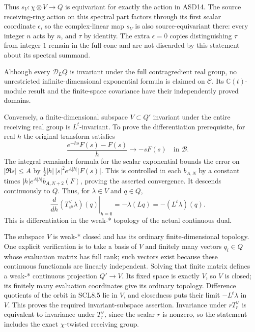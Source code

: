 Thus \(s_V:\chi\otimes V\to Q\) is equivariant for exactly the action in
ASD14. The source receiving-ring action on this spectral part factors
through its first scalar coordinate \(\epsilon\), so the complex-linear
map \(s_V\) is also source-equivariant there: every integer \(n\) acts
by \(n\), and \(\tau\) by identity. The extra \(\epsilon=0\) copies
distinguishing \(\tau\) from integer \(1\) remain in the full cone and
are not discarded by this statement about its spectral summand.

Although every \(\mathcal D_LQ\) is invariant under the full
contragredient real group, no unrestricted infinite-dimensional
exponential formula is claimed on \(\mathscr C\). Its
\(\mathbb C(t)\)-module result and the finite-space covariance have
their independently proved domains.

Conversely, a finite-dimensional subspace \(V\subset Q'\) invariant
under the entire receiving real group is \(L^t\)-invariant. To prove the
differentiation prerequisite, for real \(h\) the original transform
satisfies \[
 \frac{e^{-hs}F(s)-F(s)}h\longrightarrow-sF(s)
 \quad\text{in }\mathcal B.
 \tag{SCL8.4}
\] The integral remainder formula for the scalar exponential bounds the
error on \(|\Re s|\le A\) by \(\frac12|h|\,|s|^2e^{A|h|}|F(s)|\). This
is controlled in each \(b_{A,N}\) by a constant times
\(|h|e^{A|h|}b_{A,N+2}(F)\), proving the asserted convergence. It
descends continuously to \(Q\). Thus, for \(\lambda\in V\) and
\(q\in Q\), \[
 \left.\frac{d}{dh}(T_{e^h}^\vee\lambda)(q)\right|_{h=0}
 =-\lambda(Lq)=-(L^t\lambda)(q).
 \tag{SCL8.5}
\] This is differentiation in the weak-* topology of the actual
continuous dual.

The subspace \(V\) is weak-* closed and has its ordinary
finite-dimensional topology. One explicit verification is to take a
basis of \(V\) and finitely many vectors \(q_i\in Q\) whose evaluation
matrix has full rank; such vectors exist because these continuous
functionals are linearly independent. Solving that finite matrix defines
a weak-* continuous projection \(Q'\to V\). Its fixed space is exactly
\(V\), so \(V\) is closed; its finitely many evaluation coordinates give
its ordinary topology. Difference quotients of the orbit in SCL8.5 lie
in \(V\), and closedness puts their limit \(-L^t\lambda\) in \(V\). This
proves the required invariant-subspace assertion. Invariance under
\(rT_r^\vee\) is equivalent to invariance under \(T_r^\vee\), since the
scalar \(r\) is nonzero, so the statement includes the exact
\(\chi\)-twisted receiving group.

